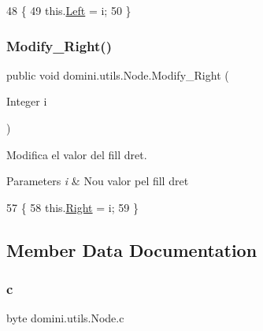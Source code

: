 \begin{DoxyCode}
48                                        \{
49         this.\hyperlink{classdomini_1_1utils_1_1Node_a2f1d911cf52953b29d42e5e020b82dbf}{Left} = i;
50     \}
\end{DoxyCode}
\mbox{\label{classdomini_1_1utils_1_1Node_a58d22f8330339b6d807cdef44d0eddf6}} 
\subsubsection{\texorpdfstring{Modify\+\_\+\+Right()}{Modify\_Right()}}
{\footnotesize\ttfamily public void domini.\+utils.\+Node.\+Modify\+\_\+\+Right (\begin{DoxyParamCaption}\item[{Integer}]{i }\end{DoxyParamCaption})\hspace{0.3cm}{\ttfamily [inline]}}



Modifica el valor del fill dret. 


\begin{DoxyParams}{Parameters}
{\em i} & Nou valor pel fill dret \\
\hline
\end{DoxyParams}

\begin{DoxyCode}
57                                         \{
58         this.\hyperlink{classdomini_1_1utils_1_1Node_a73c97e595bad2513ee0a06ee4620236a}{Right} = i;
59     \}
\end{DoxyCode}


\subsection{Member Data Documentation}
\mbox{\label{classdomini_1_1utils_1_1Node_a2fbef2557db813ae02a2d52032eaa6e1}} 
\subsubsection{\texorpdfstring{c}{c}}
{\footnotesize\ttfamily byte domini.\+utils.\+Node.\+c\hspace{0.3cm}{\ttfamily [package]}}


